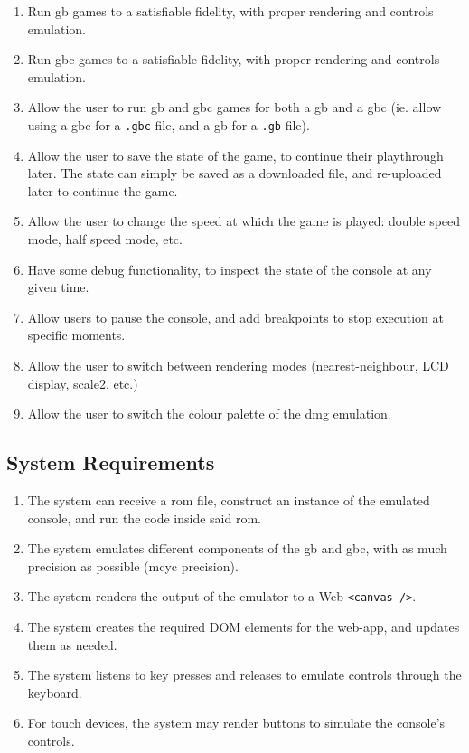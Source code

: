 \documentclass[11pt]{report}
\begin{document}
\begin{enumerate}[start=1,label=U\arabic*.]
    \item Run \glsdesc{gb} games to a satisfiable fidelity, with proper rendering and controls emulation.
    \item Run \glsdesc{gbc} games to a satisfiable fidelity, with proper rendering and controls emulation.
    \item Allow the user to run \gls{gb} and \gls{gbc} games for both a \glsdesc{gb} and a \glsdesc{gbc} (ie. allow using a \gls{gbc} for a \texttt{.gbc} file, and a \gls{gb} for a \texttt{.gb} file).
    \item Allow the user to save the state of the game, to continue their playthrough later. The state can simply be saved as a downloaded file, and re-uploaded later to continue the game.
    \item Allow the user to change the speed at which the game is played: double speed mode, half speed mode, etc.
    \item Have some debug functionality, to inspect the state of the console at any given time.
    \item Allow users to pause the console, and add breakpoints to stop execution at specific moments.
    \item Allow the user to switch between rendering modes (nearest-neighbour, LCD display, scale2, etc.)
    \item Allow the user to switch the colour palette of the \gls{dmg} emulation.
\end{enumerate}

\subsection{System Requirements}

\begin{enumerate}[start=1,label=F\arabic*.]
    \item The system can receive a \gls{rom} file, construct an instance of the emulated console, and run the code inside said \gls{rom}.
    \item The system emulates different components of the \gls{gb} and \gls{gbc}, with as much precision as possible (\gls{mcyc} precision).
    \item The system renders the output of the emulator to a Web \texttt{<canvas />}.
    \item The system creates the required DOM elements for the web-app, and updates them as needed.
    \item The system listens to key presses and releases to emulate controls through the keyboard.
    \item For touch devices, the system may render buttons to simulate the console's controls.
\end{enumerate}
\end{document}
